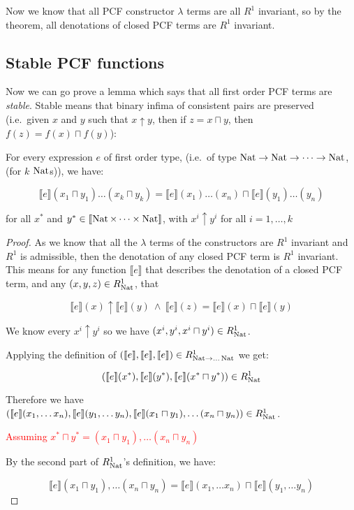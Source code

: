 Now we know that all PCF constructor $\lambda$ terms are all $R^1$ invariant, so by the theorem, all denotations of closed PCF terms are $R^1$ invariant. 

\subsection{Stable PCF functions}

Now we can go prove a lemma which says that all first order PCF terms are \emph{stable}. Stable means that binary infima of consistent pairs are preserved (i.e.\ given $x$ and $y$ such that $x \uparrow y$, then if $z = x \sqcap y$, then $f(z) = f(x) \sqcap f(y)$):

\vspace{0.5cm}

\begin{lem}{\citep{Streicher06}}\label{stable}
For every expression $e$ of first order type, (i.e.\ of type $\operatorname{Nat} \to \operatorname{Nat} \to \dots \to \operatorname{Nat}$, (for $k$ $\operatorname{Nat}$s)), we have:

\[ \llbracket e \rrbracket (x_1 \sqcap y_1) \dots (x_k \sqcap y_k)  =  \llbracket e \rrbracket(x_1) \dots (x_n) \sqcap \llbracket e \rrbracket(y_1) \dots (y_n)\]

for all $x^*$ and $y^* \in \llbracket \operatorname{Nat} \times \dots \times \operatorname{Nat} \rrbracket$, with $x^i \uparrow y^i$ for all $i = 1, \dots , k$ 
\end{lem}

\begin{proof}
As we know that all the  $\lambda$ terms of the constructors are $R^1$ invariant and $R^1$ is admissible, then the denotation of any closed PCF term is $R^1$ invariant. This means for any function $\llbracket e \rrbracket$ that describes the denotation of a closed PCF term, and any $(x,y,z) \in R_{\operatorname{Nat}}^1$, that

\[ \llbracket e \rrbracket (x) \uparrow \llbracket e \rrbracket(y) \ \wedge \ \llbracket e \rrbracket(z) = \llbracket e \rrbracket(x) \sqcap \llbracket e \rrbracket(y) \]

We know every $x^i \uparrow y^i$ so we have $(x^i, y^i, x^i \sqcap y^i) \in R_{\operatorname{Nat}}^1$.

Applying the definition of $(\llbracket e \rrbracket , \llbracket e \rrbracket, \llbracket e \rrbracket) \in R_{\operatorname{Nat} \to \dots \operatorname{Nat}}^1$ we get:

\[ (\llbracket e \rrbracket(x^*), \llbracket e \rrbracket(y^*), \llbracket e \rrbracket (x^* \sqcap y^*)) \in R_{\operatorname{Nat}}^1 \]

Therefore we have $(\llbracket e \rrbracket(x_1, \dots x_n), \llbracket e \rrbracket(y_1, \dots y_n),\llbracket e \rrbracket(x_1 \sqcap y_1), \dots (x_n \sqcap y_n)) \in R_{\operatorname{Nat}}^1$.

\textcolor{red}{Assuming $x^* \sqcap y^* = (x_1 \sqcap y_1), \dots (x_n \sqcap y_n)$}

By the second part of $R_{\operatorname{Nat}}^1$'s definition, we have:

\[ \llbracket e \rrbracket(x_1 \sqcap y_1), \dots (x_n \sqcap y_n) = \llbracket e \rrbracket(x_1, \dots x_n) \sqcap \llbracket e \rrbracket(y_1, \dots y_n)\]
\end{proof}

